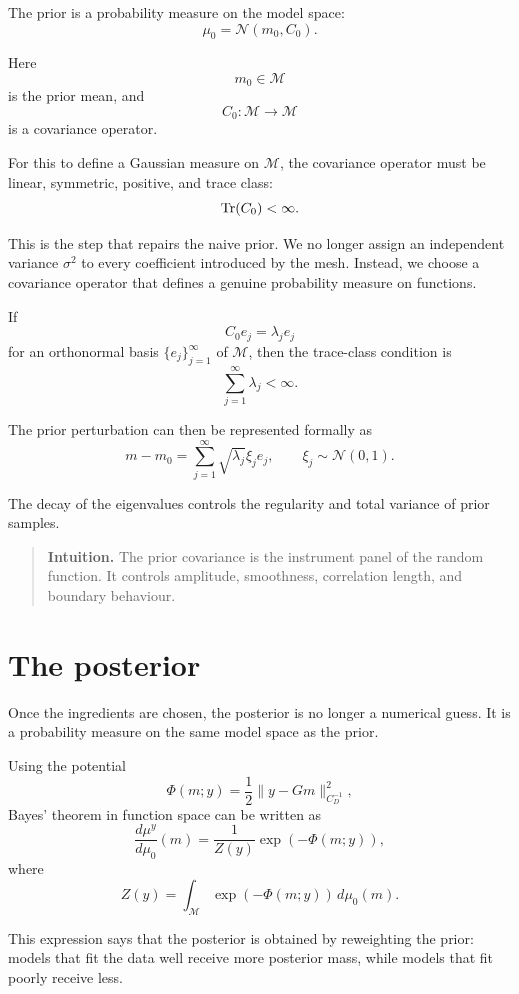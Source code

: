 \documentclass[11pt,a4paper]{book}
\newenvironment{intuition}
  {\begin{quote}\textbf{Intuition.}}
  {\end{quote}}
\newcommand{\M}{\mathcal{M}}      %
\newcommand{\prior}{\mu_0}
\newcommand{\post}{\mu^y}
\newcommand{\obs}{y}
\newcommand{\G}{G}
\begin{document}
The prior is a probability measure on the model space:
\[
    \prior = \mathcal{N}(m_0,C_0).
\]

Here
\[
    m_0\in\M
\]
is the prior mean, and
\[
    C_0:\M\to\M
\]
is a covariance operator.

For this to define a Gaussian measure on $\M$, the covariance operator must be
linear, symmetric, positive, and trace class:
\[
    \Tr(C_0)<\infty.
\]

This is the step that repairs the naive prior. We no longer assign an
independent variance $\sigma^2$ to every coefficient introduced by the mesh.
Instead, we choose a covariance operator that defines a genuine probability
measure on functions.

If
\[
    C_0 e_j=\lambda_j e_j
\]
for an orthonormal basis $\{e_j\}_{j=1}^{\infty}$ of $\M$, then the trace-class
condition is
\[
    \sum_{j=1}^{\infty}\lambda_j<\infty.
\]

The prior perturbation can then be represented formally as
\[
    m-m_0
    =
    \sum_{j=1}^{\infty}
    \sqrt{\lambda_j}\xi_j e_j,
    \qquad
    \xi_j\sim\mathcal{N}(0,1).
\]

The decay of the eigenvalues controls the regularity and total variance of
prior samples.

\begin{intuition}
The prior covariance is the instrument panel of the random function. It controls
amplitude, smoothness, correlation length, and boundary behaviour.
\end{intuition}

\section{The posterior}

Once the ingredients are chosen, the posterior is no longer a numerical guess.
It is a probability measure on the same model space as the prior.

Using the potential
\[
    \Phi(m;\obs)
    =
    \frac{1}{2}
    \|\obs-\G m\|_{C_D^{-1}}^2,
\]
Bayes' theorem in function space can be written as
\[
    \frac{d\post}{d\prior}(m)
    =
    \frac{1}{Z(\obs)}
    \exp(-\Phi(m;\obs)),
\]
where
\[
    Z(\obs)
    =
    \int_{\M}
    \exp(-\Phi(m;\obs))
    \,d\prior(m).
\]

This expression says that the posterior is obtained by reweighting the prior:
models that fit the data well receive more posterior mass, while models that
fit poorly receive less.
\end{document}
